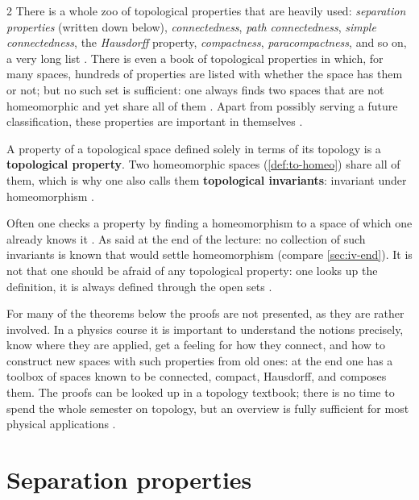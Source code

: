 \begin{paracol}{2}
There is a whole zoo of topological properties that are heavily used: \emph{separation properties} (written down below),
\emph{connectedness}, \emph{path connectedness}, \emph{simple connectedness}, the \emph{Hausdorff} property,
\emph{compactness}, \emph{paracompactness}, and so on, a very long list . There is even a book of
topological properties in which, for many spaces, hundreds of properties are listed with whether the space has them or not;
but no such set is sufficient: one always finds two spaces that are not homeomorphic and yet share all of them
. Apart from possibly serving a future classification, these properties are important in themselves
.

\begin{definition}\label{def:iv-invariant}
A property of a topological space defined solely in terms of its topology is a \textbf{topological property}. Two homeomorphic spaces
(\cref{def:to-homeo}) share all of them, which is why one also calls them \textbf{topological invariants}: invariant under
homeomorphism .
\end{definition}
Often one checks a property by finding a homeomorphism to a space of which one already knows it . As said at the end of the lecture:
no collection of such invariants is known that would settle homeomorphism (compare \cref{sec:iv-end}). It is not that one should be afraid of
any topological property: one looks up the definition, it is always defined through the open sets .

For many of the theorems below the proofs are not presented, as they are rather involved. In a physics course it is important to understand the
notions precisely, know where they are applied, get a feeling for how they connect, and how to construct new spaces with such properties from old
ones: at the end one has a toolbox of spaces known to be connected, compact, Hausdorff, and composes them. The proofs can be looked up in a topology
textbook; there is no time to spend the whole semester on topology, but an overview is fully sufficient for most physical applications
.

\section{Separation properties}\label{sec:iv-sep}


\end{paracol}
